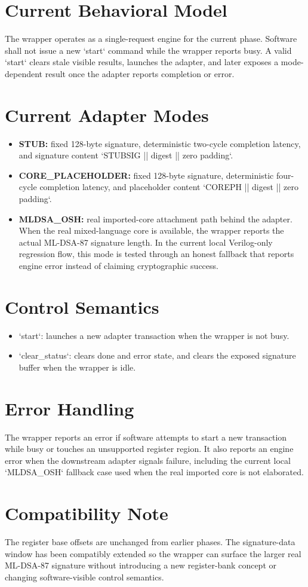 \section{Current Behavioral Model}
The wrapper operates as a single-request engine for the current phase. Software shall not issue a new `start` command while the wrapper reports busy. A valid `start` clears stale visible results, launches the adapter, and later exposes a mode-dependent result once the adapter reports completion or error.

\section{Current Adapter Modes}
\begin{itemize}[leftmargin=*]
  \item \textbf{STUB:} fixed 128-byte signature, deterministic two-cycle completion latency, and signature content `STUBSIG || digest || zero padding`.
  \item \textbf{CORE\_PLACEHOLDER:} fixed 128-byte signature, deterministic four-cycle completion latency, and placeholder content `COREPH || digest || zero padding`.
  \item \textbf{MLDSA\_OSH:} real imported-core attachment path behind the adapter. When the real mixed-language core is available, the wrapper reports the actual ML-DSA-87 signature length. In the current local Verilog-only regression flow, this mode is tested through an honest fallback that reports engine error instead of claiming cryptographic success.
\end{itemize}

\section{Control Semantics}
\begin{itemize}[leftmargin=*]
  \item `start`: launches a new adapter transaction when the wrapper is not busy.
  \item `clear\_status`: clears done and error state, and clears the exposed signature buffer when the wrapper is idle.
\end{itemize}

\section{Error Handling}
The wrapper reports an error if software attempts to start a new transaction while busy or touches an unsupported register region. It also reports an engine error when the downstream adapter signals failure, including the current local `MLDSA\_OSH` fallback case used when the real imported core is not elaborated.

\section{Compatibility Note}
The register base offsets are unchanged from earlier phases. The signature-data window has been compatibly extended so the wrapper can surface the larger real ML-DSA-87 signature without introducing a new register-bank concept or changing software-visible control semantics.